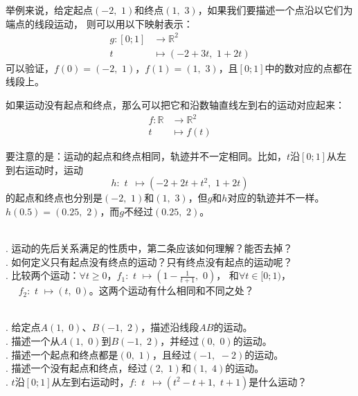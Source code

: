 \documentclass[12pt,UTF8,fontset=none]{ctexbook}
\begin{document}
举例来说，给定起点$(-2,\,\,1)$和终点$(1,\,\,3)$，如果我们要描述一个点沿以它们为端点的线段运动，
则可以用以下映射表示：
\begin{align*}
    g: [0;1] &\rightarrow \mathbb{R}^2  \\
         t \,\,\, &\mapsto (-2 + 3t,\,\, 1 + 2t) 
\end{align*}
可以验证，$f(0) = (-2,\,\,1)$，$f(1) = (1,\,\,3)$，且$[0;1]$中的数对应的点都在线段上。

如果运动没有起点和终点，那么可以把它和沿数轴直线左到右的运动对应起来：
\begin{align*}
    f: \mathbb{R} &\rightarrow \mathbb{R}^2  \\
         t \, &\mapsto f(t) 
\end{align*}

要注意的是：运动的起点和终点相同，轨迹并不一定相同。比如，$t$沿$[0;1]$从左到右运动时，运动
$$ h: \,\, t \,\,\, \mapsto (-2 + 2t + t^2,\,\, 1 + 2t) $$
的起点和终点也分别是$(-2,\,\,1)$和$(1,\,\,3)$，但$g$和$h$对应的轨迹并不一样。
$h(0.5) = (0.25, \,\,2)$，而$g$不经过$(0.25, \,\,2)$。

\begin{sk}
    \mbox{} \\
    . 运动的先后关系满足的性质中，第二条应该如何理解？能否去掉？\\
    . 如何定义只有起点没有终点的运动？只有终点没有起点的运动呢？\\
    . 比较两个运动：$\forall t \geqslant 0$，$f_1:\,\, t \,\, \mapsto (1 - \frac{1}{t+1}, \,\, 0)$，
    和$\forall t \in [0; 1)$，\\
    \indent $\quad \,\, f_2:\,\, t \,\, \mapsto (t, \,\,0)$。这两个运动有什么相同和不同之处？
\end{sk}

\begin{xt}
    \mbox{} \\
    . 给定点$A(1,\,\,0)$、$B(-1,\,\,2)$，描述沿线段$AB$的运动。\\
    . 描述一个从$A(1,\,\,0)$到$B(-1,\,\,2)$，并经过$(0,\,\,0)$的运动。\\
    . 描述一个起点和终点都是$(0, \,\, 1)$，且经过$(-1,\,\, -2)$的运动。\\
    . 描述一个没有起点和终点，经过$(2,\,\, 1)$和$(1,\,\, 4)$的运动。\\
    . $t$沿$[0;1]$从左到右运动时，$f: \,\, t \,\,\, \mapsto (t^2 - t + 1, \,\, t + 1)$是什么运动？
\end{xt}
\end{document}
